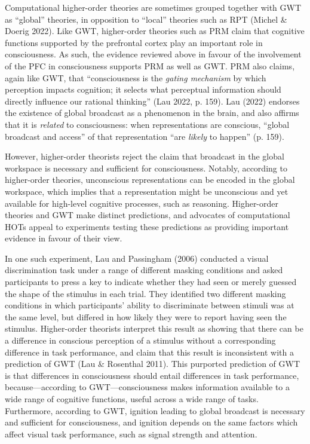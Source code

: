 \documentclass[12pt]{article}
\begin{document}
Computational higher-order theories are sometimes grouped together with GWT as ``global'' theories, in opposition to ``local'' theories such as RPT (Michel \& Doerig 2022). Like GWT, higher-order theories such as PRM claim that cognitive functions supported by the prefrontal cortex play an important role in consciousness. As such, the evidence reviewed above in favour of the involvement of the PFC in consciousness supports PRM as well as GWT. PRM also claims, again like GWT, that ``consciousness is the \textit{gating mechanism} by which perception impacts cognition; it selects what perceptual information should directly influence our rational thinking'' (Lau 2022, p. 159). Lau (2022) endorses the existence of global broadcast as a phenomenon in the brain, and also affirms that it is \textit{related} to consciousness: when representations are conscious, ``global broadcast and access'' of that representation ``are \textit{likely} to happen'' (p. 159).

However, higher-order theorists reject the claim that broadcast in the global workspace is necessary and sufficient for consciousness. Notably, according to higher-order theories, unconscious representations can be encoded in the global workspace, which implies that a representation might be unconscious and yet available for high-level cognitive processes, such as reasoning. Higher-order theories and GWT make distinct predictions, and advocates of computational HOTs appeal to experiments testing these predictions as providing important evidence in favour of their view.

In one such experiment, Lau and Passingham (2006) conducted a visual discrimination task under a range of different masking conditions and asked participants to press a key to indicate whether they had seen or merely guessed the shape of the stimulus in each trial. They identified two different masking conditions in which participants’ ability to discriminate between stimuli was at the same level, but differed in how likely they were to report having seen the stimulus. Higher-order theorists interpret this result as showing that there can be a difference in conscious perception of a stimulus without a corresponding difference in task performance, and claim that this result is inconsistent with a prediction of GWT (Lau \& Rosenthal 2011). This purported prediction of GWT is that differences in consciousness should entail differences in task performance, because—according to GWT—consciousness makes information available to a wide range of cognitive functions, useful across a wide range of tasks. Furthermore, according to GWT, ignition leading to global broadcast is necessary and sufficient for consciousness, and ignition depends on the same factors which affect visual task performance, such as signal strength and attention.
\end{document}

